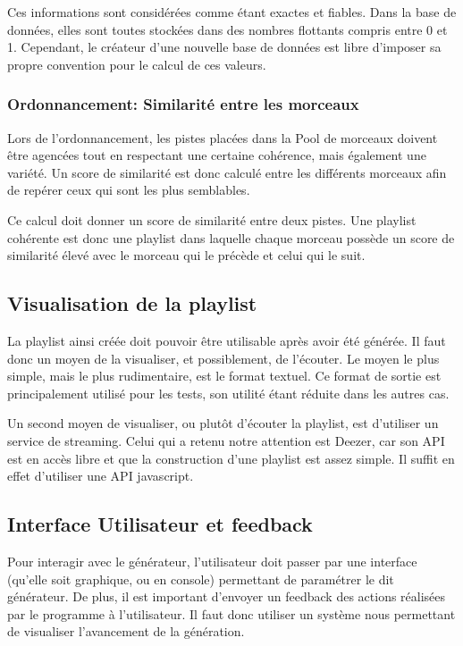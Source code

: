 Ces informations sont considérées comme étant exactes et fiables. Dans la base 
de données, elles sont toutes stockées dans des nombres flottants compris entre 
0 et 1. Cependant, le créateur d'une nouvelle base de données est libre 
d'imposer sa propre convention pour le calcul de ces valeurs.

\subsubsection{Ordonnancement: Similarité entre les morceaux}
\label{besoins:fonc:generation:selection:ordonnancement}

Lors de l'ordonnancement, les pistes placées dans la Pool de morceaux doivent 
être agencées tout en respectant une certaine cohérence, mais également une 
variété. Un score de similarité est donc calculé entre les différents morceaux 
afin de repérer ceux qui sont les plus semblables.

Ce calcul doit donner un score de similarité entre deux pistes. Une playlist 
cohérente est donc une playlist dans laquelle chaque morceau possède un score 
de similarité élevé avec le morceau qui le précède et celui qui le suit.

\subsection{Visualisation de la playlist}
\label{besoins:fonc:generation:visu}

La playlist ainsi créée doit pouvoir être utilisable après avoir été générée. 
Il faut donc un moyen de la visualiser, et possiblement, de l’écouter. Le 
moyen le plus simple, mais le plus rudimentaire, est le format textuel. Ce 
format de sortie est principalement utilisé pour les tests, son utilité étant 
réduite dans les autres cas.

Un second moyen de visualiser, ou plutôt d'écouter la playlist, est d’utiliser 
un service de streaming. Celui qui a retenu notre attention est Deezer, car son 
API est en accès libre et que la construction d'une playlist est assez simple. 
Il suffit en effet d’utiliser une API javascript.
        
\subsection{Interface Utilisateur et feedback}
\label{besoins:fonc:generation:feedback}

Pour interagir avec le générateur, l’utilisateur doit passer par une interface 
(qu'elle soit graphique, ou en console) permettant de paramétrer le dit 
générateur. De plus, il est important d’envoyer un feedback des actions 
réalisées par le programme à l’utilisateur. Il faut donc utiliser un système 
nous permettant de visualiser l’avancement de la génération.

